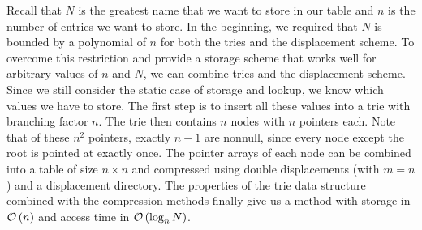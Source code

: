 Recall that $N$ is the greatest name that we want to store in our table and $n$ is the number of entries we want to store.
In the beginning, we required that $N$ is bounded by a polynomial of $n$ for both the tries and the displacement scheme.
To overcome this restriction and provide a storage scheme that works well for arbitrary values of $n$ and $N$, we can combine tries and the displacement scheme.
Since we still consider the static case of storage and lookup, we know which values we have to store.
The first step is to insert all these values into a trie with branching factor $n$.
The trie then contains $n$ nodes with $n$ pointers each.
Note that of these $n^2$ pointers, exactly $n - 1$ are nonnull, since every node except the root is pointed at exactly once.
The pointer arrays of each node can be combined into a table of size $n \times n$ and compressed using double displacements (with $m = n$) and a displacement directory.
The properties of the trie data structure combined with the compression methods finally give us a method with storage in $\mathcal{O}\left(n\right)$ and access time in $\mathcal{O}\left(\log_n N\right)$.
